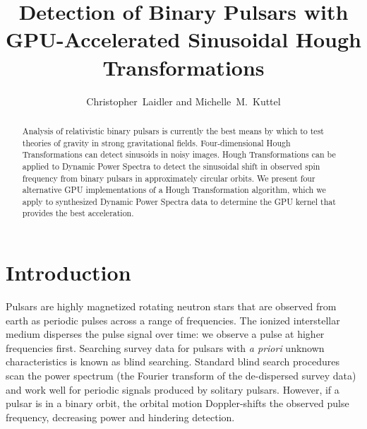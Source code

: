 


\resetcounters



\title{Detection of Binary Pulsars with GPU-Accelerated Sinusoidal Hough Transformations}
\author{Christopher~Laidler and Michelle~M.~Kuttel
}

\begin{abstract}
Analysis of relativistic binary pulsars is currently the best means by which to test theories of gravity in strong gravitational fields. Four-dimensional Hough Transformations can detect sinusoids in noisy images. Hough Transformations can be applied to Dynamic Power Spectra to detect the sinusoidal shift in observed spin frequency from binary pulsars in approximately circular orbits. We present four  alternative GPU implementations of a Hough Transformation algorithm, which we apply to synthesized  Dynamic Power Spectra data to determine  the GPU kernel that provides the best acceleration.
\end{abstract}

\section{Introduction}
Pulsars are highly magnetized rotating neutron stars that are observed from earth as periodic pulses across a range of frequencies. The ionized interstellar medium disperses the pulse signal over time:  we observe a pulse at higher frequencies first. Searching survey data for pulsars with \emph{a priori }unknown characteristics is known as blind searching. Standard blind search procedures scan the power spectrum (the Fourier transform of the de-dispersed survey data) and work well for periodic signals produced by solitary pulsars. However, if a pulsar is in a binary orbit, the orbital motion Doppler-shifts the observed pulse frequency, decreasing power and hindering detection.

